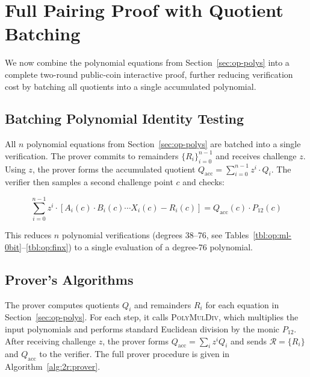 \section{Full Pairing Proof with Quotient Batching}
\label{sec:iop}

We now combine the polynomial equations from Section~\ref{sec:op-polys} into a complete two-round public-coin interactive proof, further reducing verification cost by batching all quotients into a single accumulated polynomial.

\subsection{Batching Polynomial Identity Testing}\label{sec:iop:batching}

All $n$ polynomial equations from Section~\ref{sec:op-polys} are batched into a single verification. The prover commits to remainders $\{R_i\}_{i=0}^{n-1}$ and receives challenge $z$. Using $z$, the prover forms the accumulated quotient $Q_\text{acc} = \sum_{i=0}^{n-1} z^i \cdot Q_i$. The verifier then samples a second challenge point $c$ and checks:

\begin{equation}
    \label{eq:iop-batched}
    \sum_{i=0}^{n - 1}z^i \cdot [A_i(c) \cdot B_i(c) \cdots X_i(c) - R_i(c)] = Q_\text{acc}(c) \cdot P_{12}(c)
\end{equation}

This reduces $n$ polynomial verifications (degrees 38--76, see Tables~\ref{tbl:op:ml-0bit}--\ref{tbl:op:finx}) to a single evaluation of a degree-76 polynomial.

\subsection{Prover's Algorithms}

The prover computes quotients $Q_i$ and remainders $R_i$ for each equation in Section~\ref{sec:op-polys}. For each step, it calls \textsc{PolyMulDiv}, which multiplies the input polynomials and performs standard Euclidean division by the monic $P_{12}$. After receiving challenge $z$, the prover forms $Q_\text{acc} = \sum_{i} z^i Q_i$ and sends $\mathcal{R} = \{R_i\}$ and $Q_\text{acc}$ to the verifier. The full prover procedure is given in Algorithm~\ref{alg:2r:prover}.


